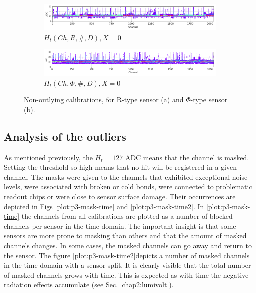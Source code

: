 \begin{figure}
    \centering
    
    \begin{subfigure}[b]{\textwidth}
    \includegraphics[width=\linewidth]{figures/chapter4/calib_analysis/P2-only-good-R.png}
    \caption{$H_t(Ch, R, \#, D), X=0$}
   \label{plot:only_good_r}
  \end{subfigure}
  
  \begin{subfigure}[b]{\textwidth}
    \includegraphics[width=\linewidth]{figures/chapter4/calib_analysis/P2-only-good-phi.png}
    \caption{$H_t(Ch, \Phi, \#, D), X=0$}
   \label{plot:only_good_phi}
  \end{subfigure}
      \caption[All calond]{Non-outlying calibrations, for R-type sensor (a) and $\Phi$-type sensor (b).}
    \label{plot:only_good_all}
  
  \end{figure}

\subsection{Analysis of the outliers}
\label{chap4:masks}
As mentioned previously, the $H_t=127$ ADC means that the channel is masked.
Setting the threshold so high means that no hit will be registered in a given channel.
The masks were given to the channels that exhibited exceptional noise levels, were associated with broken or cold bonds, were connected to problematic readout chips or were close to sensor surface damage.
Their occurrences are depicted in Figs \ref{plot:p3-mask-time} and \ref{plot:p3-mask-time2}.
In  \ref{plot:p3-mask-time} the channels from all calibrations are plotted as a number of blocked channels per sensor in the time domain.
The important insight is that some sensors are more prone to masking than others and that the amount of masked channels changes.
In some cases, the masked channels can go away and return to the sensor.
The figure \ref{plot:p3-mask-time2}depicts a number of masked channels in the time domain with a sensor split.
It is clearly visible that the total number of masked channels grows with time.
This is expected as with time the negative radiation effects accumulate (see Sec. \ref{chap2:lumivolt}).

